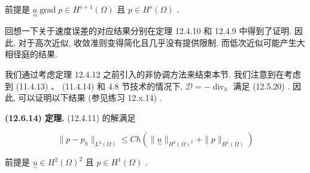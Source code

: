 前提是 $\underset{\approx}{a} \operatorname{grad}p \in H^{s + 1}(\Omega)$ 且 $p \in H^{s}(\Omega)$ .

回想一下关于速度误差的对应结果分别在定理 12.4.10 和 12.4.9 中得到了证明. 因此, 对于高次近似, 收敛准则变得简化且几乎没有提供限制, 而低次近似可能产生大相径庭的结果.

我们通过考虑定理 12.4.12 之前引入的非协调方法来结束本节. 我们注意到在考虑到 (11.4.13) 、 (11.4.14) 和 4.8 节技术的情况下, $\mathcal{D} = -\operatorname{div}_{h}$ 满足 (12.5.20) . 因此, 可以证明以下结果 (参见练习 12.x.14) .

\textbf{(12.6.14) 定理.} (12.4.11) 的解满足

$$
\|p - p_{h}\|_{L^{2}(\Omega)} \leq C h (\|\underset{\sim}{u}\|_{H^{2}(\Omega)^{2}} + \|p\|_{H^{1}(\Omega)})
$$

前提是 $\underset{\sim}{u} \in H^{2}(\Omega)^{2}$ 且 $p \in H^{1}(\Omega)$ .



